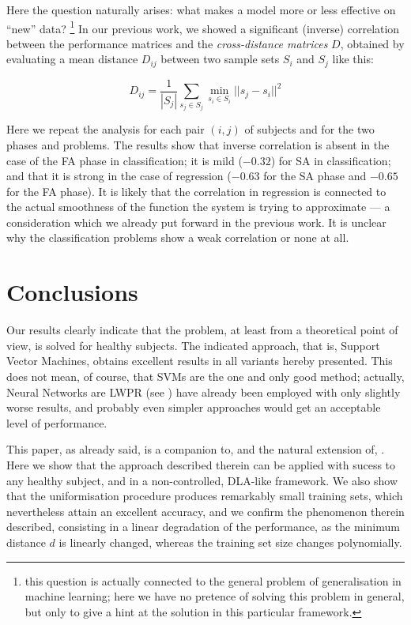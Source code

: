 \documentclass[10pt]{bmc_article}
\newenvironment{bmcformat}{\begin{raggedright}\baselineskip20pt\sloppy\setboolean{publ}{false}}{\end{raggedright}\baselineskip20pt\sloppy}
\begin{document}
\begin{bmcformat}
Here the question naturally arises: what makes a model more or less
effective on ``new'' data? \footnote{this question is actually
connected to the general problem of generalisation in machine
learning; here we have no pretence of solving this problem in general,
but only to give a hint at the solution in this particular framework.}
In our previous work, we showed a significant (inverse) correlation
between the performance matrices and the \emph{cross-distance
matrices} $D$, obtained by evaluating a mean distance $D_{ij}$ between
two sample sets $S_i$ and $S_j$ like this:

$$ D_{ij} = \frac{1}{|S_j|} \sum_{s_j \in S_j}{\min_{s_i \in S_i}{ ||s_j-s_i||^2 } } $$

Here we repeat the analysis for each pair $(i,j)$ of subjects and for
the two phases and problems. The results show that inverse correlation
is absent in the case of the FA phase in classification; it is mild
($-0.32$) for SA in classification; and that it is strong in the case
of regression ($-0.63$ for the SA phase and $-0.65$ for the FA
phase). It is likely that the correlation in regression is connected
to the actual smoothness of the function the system is trying to
approximate --- a consideration which we already put forward in the
previous work. It is unclear why the classification problems show a
weak correlation or none at all.

\section*{Conclusions}
\label{sec:discussion}
  
Our results clearly indicate that the problem, at least from a
theoretical point of view, is solved for healthy subjects. The
indicated approach, that is, Support Vector Machines, obtains
excellent results in all variants hereby presented. This does not
mean, of course, that SVMs are the one and only good method; actually,
Neural Networks are LWPR (see \cite{lwpr}) have already been employed
with only slightly worse results, and probably even simpler approaches
would get an acceptable level of performance.

This paper, as already said, is a companion to, and the natural
extension of, \cite{2008.ICRA,2008.BioCyb}. Here we show that the
approach described therein can be applied with sucess to any healthy
subject, and in a non-controlled, DLA-like framework. We also show
that the uniformisation procedure produces remarkably small training
sets, which nevertheless attain an excellent accuracy, and we confirm
the phenomenon therein described, consisting in a linear degradation
of the performance, as the minimum distance $d$ is linearly changed,
whereas the training set size changes polynomially.


\end{bmcformat}
\end{document}
